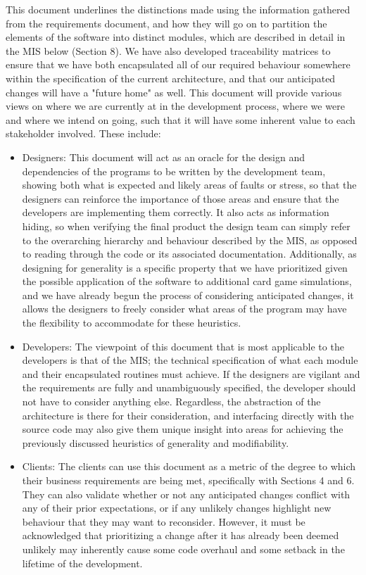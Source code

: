 \documentclass[12pt, titlepage]{article}
\begin{document}
This document underlines the distinctions made using the information gathered from the requirements document, and how they will go on to partition the elements of the software into distinct modules, which are described in detail in the MIS below (Section 8). We have also developed traceability matrices to ensure that we have both encapsulated all of our required behaviour somewhere within the specification of the current architecture, and that our anticipated changes will have a "future home" as well. This document will provide various views on where we are currently at in the development process, where we were and where we intend on going, such that it will have some inherent value to each stakeholder involved. These include:

\begin{itemize}
    \item Designers: This document will act as an oracle for the design and dependencies of the programs to be written by the development team, showing both what is expected and likely areas of faults or stress, so that the designers can reinforce the importance of those areas and ensure that the developers are implementing them correctly. It also acts as information hiding, so when verifying the final product the design team can simply refer to the overarching hierarchy and behaviour described by the MIS, as opposed to reading through the code or its associated documentation. Additionally, as designing for generality is a specific property that we have prioritized given the possible application of the software to additional card game simulations, and we have already begun the process of considering anticipated changes, it allows the designers to freely consider what areas of the program may have the flexibility to accommodate for these heuristics.
    \item Developers: The viewpoint of this document that is most applicable to the developers is that of the MIS; the technical specification of what each module and their encapsulated routines must achieve. If the designers are vigilant and the requirements are fully and unambiguously specified, the developer should not have to consider anything else. Regardless, the abstraction of the architecture is there for their consideration, and interfacing directly with the source code may also give them unique insight into areas for achieving the previously discussed heuristics of generality and modifiability.
    \item Clients: The clients can use this document as a metric of the degree to which their business requirements are being met, specifically with Sections 4 and 6. They can also validate whether or not any anticipated changes conflict with any of their prior expectations, or if any unlikely changes highlight new behaviour that they may want to reconsider. However, it must be acknowledged that prioritizing a change after it has already been deemed unlikely may inherently cause some code overhaul and some setback in the lifetime of the development.  
\end{itemize}
\end{document}

